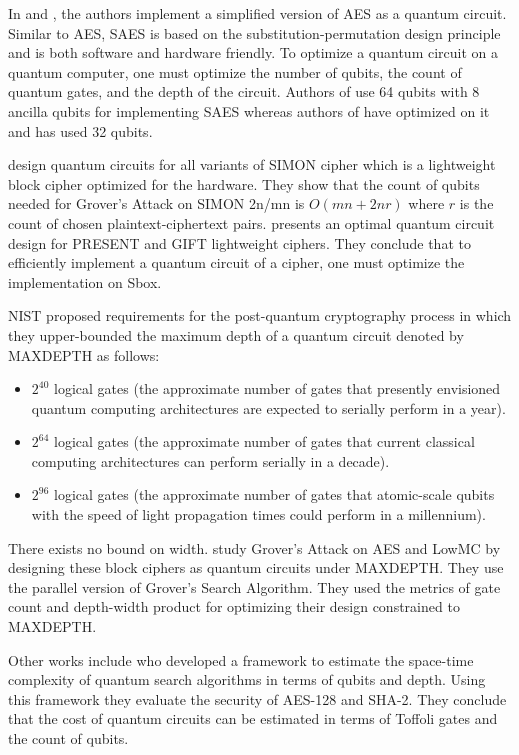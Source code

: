 \documentclass[preprint]{transcrypto}
\begin{document}
In \cite{Almazrooie} and \cite{Jang}, the authors implement a simplified version of AES as a quantum circuit. Similar to AES, SAES is based on the substitution-permutation design principle and is both software and hardware friendly\cite{aescomment}. To optimize a quantum circuit on a quantum computer, one must optimize the number of qubits, the count of quantum gates, and the depth of the circuit. Authors of \cite{Almazrooie} use 64 qubits with 8 ancilla qubits for implementing SAES whereas authors of \cite{Jang} have optimized on it and has used 32 qubits.

\cite{gos} design quantum circuits for all variants of SIMON cipher which is a lightweight block cipher optimized for the hardware. They show that the count of qubits needed for Grover's Attack on SIMON 2n/mn is $O(mn + 2nr)$ where $r$ is the count of chosen plaintext-ciphertext pairs. \cite{gop} presents an optimal quantum circuit design for PRESENT and GIFT lightweight ciphers. They conclude that to efficiently implement a quantum circuit of a cipher, one must optimize the implementation on Sbox. 

NIST\cite{nist} proposed requirements for the post-quantum cryptography process in which they upper-bounded the maximum depth of a quantum circuit denoted by MAXDEPTH as follows:

\begin{itemize}
    \item $2^{40}$ logical gates (the approximate number of gates that presently envisioned quantum computing architectures are expected to serially perform in a year).
    \item $2^{64}$ logical gates (the approximate number of gates that current classical computing architectures can perform serially in a decade).
    \item $2^{96}$ logical gates (the approximate number of gates that atomic-scale qubits with the speed of light propagation times could perform in a millennium).
\end{itemize}

There exists no bound on width. \cite{aeslowmc} study Grover's Attack on AES and LowMC by designing these block ciphers as quantum circuits under MAXDEPTH. They use the parallel version of Grover's Search Algorithm. They used the metrics of gate count and depth-width product for optimizing their design constrained to MAXDEPTH. 

Other works include \cite{tsc} who developed a framework to estimate the space-time complexity of quantum search algorithms in terms of qubits and depth. Using this framework they evaluate the security of AES-128 and SHA-2. They conclude that the cost of quantum circuits can be estimated in terms of Toffoli gates and the count of qubits. 
\end{document}
